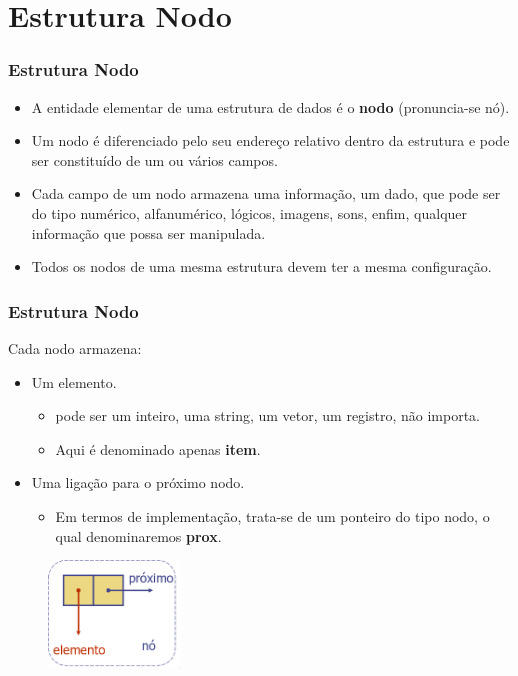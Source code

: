 \documentclass[aspectratio=169]{beamer}
\begin{document}
\section{Estrutura Nodo}

\begin{frame}
\frametitle{Estrutura Nodo}
\begin{itemize}
 \item A  entidade elementar de uma estrutura de dados é o {\bf nodo} (pronuncia-se nó). 
 \item Um nodo é diferenciado pelo seu endereço relativo dentro da estrutura  e pode ser constituído de um ou vários campos. 
 \item Cada campo de um nodo armazena uma informação, um dado, que pode ser do tipo numérico, alfanumérico, lógicos, imagens, sons, enfim, qualquer informação que possa ser manipulada. 
 \item Todos os nodos de uma mesma estrutura devem ter a mesma configuração. 
\end{itemize}
\end{frame}


\begin{frame}
\frametitle{Estrutura Nodo}
Cada nodo armazena:
\begin{itemize}
 \item Um elemento.
  \begin{itemize}
  \item pode ser um inteiro, uma string, um vetor, um registro, não importa. 
  \item Aqui é denominado apenas {\bf item}.
  \end{itemize}  
 \item Uma ligação para o próximo nodo. 
 \begin{itemize}
 \item Em termos de implementação, trata-se de um ponteiro do tipo nodo, o qual denominaremos {\bf prox}.
 \end{itemize}
 \end{itemize}
\begin{figure}[!h]
  \centering
   \includegraphics[width=100pt]{imgs/nodo.png}
  \label{fig_introducao}
\end{figure}
\end{frame}
\end{document}
